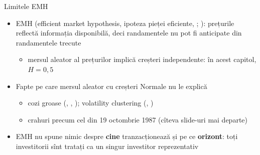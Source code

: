 \begin{frame}{Limitele EMH}
\itemsize{\small}
\begin{itemize}
    \item EMH (efficient market hypothesis, ipoteza pieței eficiente, ; ): prețurile reflectă informația disponibilă, deci randamentele nu pot fi anticipate din randamentele trecute
    \begin{itemize}
        \item mersul aleator al prețurilor implică creșteri independente: în acest capitol, $H = 0{,}5$
    \end{itemize}
    \item Fapte pe care mersul aleator cu creșteri Normale nu le explică
    \begin{itemize}
        \item cozi groase (, , ); volatility clustering (, )
        \item crahuri precum cel din 19 octombrie 1987 (cîteva slide-uri mai departe)
    \end{itemize}
    \item EMH nu spune nimic despre \textbf{cine} tranzacționează și pe ce \textbf{orizont}: toți investitorii sînt tratați ca un singur investitor reprezentativ
\end{itemize}
\end{frame}

